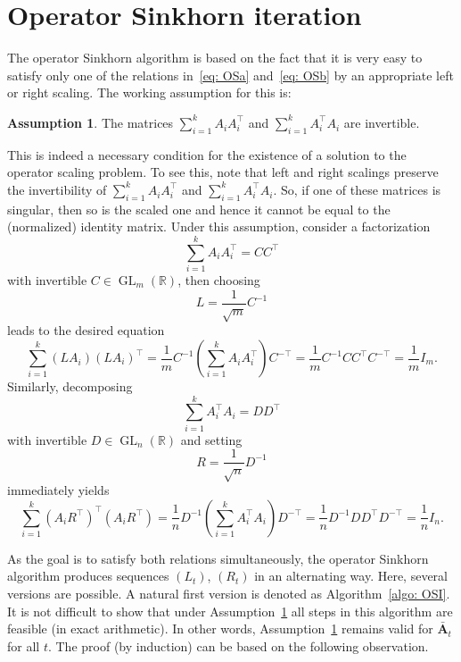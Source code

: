 \documentclass[a4paper]{article}
\newcommand{\R}{\mathbb{R}}
\newcommand{\bA}{\mathbf{A}}
\DeclareMathOperator{\GL}{GL}
\theoremstyle{definition}
\newtheorem{assumption}[theorem]{Assumption}
\numberwithin{equation}{section}
\begin{document}
\section{Operator Sinkhorn iteration}\label{sec: operator Sinkhorn}

The operator Sinkhorn algorithm is based on the fact that it is very easy to satisfy only one of the relations in~\eqref{eq: OSa} and~\eqref{eq: OSb} by an appropriate left or right scaling. The working assumption for this is:

\begin{assumption}\label{assumption 1}
The matrices $\sum_{i=1}^k A_i^{} A_i^\top$ and $\sum_{i=1}^k A_i^\top A_i^{}$ are invertible.
\end{assumption}
This is indeed a necessary condition for the existence of a solution to the operator scaling problem.
To see this, note that left and right scalings preserve the invertibility of $\sum_{i=1}^k A_i^{} A_i^\top$ and $\sum_{i=1}^k A_i^\top A_i^{}$.
So, if one of these matrices is singular, then so is the scaled one and hence it cannot be equal to the (normalized) identity matrix. Under this assumption, consider a factorization
\[
 \sum_{i=1}^k A_i^{} A_i^\top = C C^\top
\]
with invertible $C \in \GL_m(\R)$, then choosing
\begin{equation}\label{eq: update rule for L}
 L = \frac{1}{\sqrt{m}} C^{-1}
\end{equation}
leads to the desired equation
\[
 \sum_{i=1}^k (L A_i^{}) (L A_i)^\top = \frac{1}{m} C^{-1} \left( \sum_{i=1}^k A_i^{} A_i^\top \right) C^{-\top} = \frac{1}{m} C^{-1} C C^\top C^{-\top} = \frac{1}{m} I_m.
\]
Similarly, decomposing
\[
 \sum_{i=1}^k A_i^{\top} A_i^{} = D D^\top
\]
with invertible $D \in \GL_n(\R)$ and setting
\begin{equation}\label{eq: update rule for R}
 R = \frac{1}{\sqrt{n}} D^{-1}
\end{equation}
immediately yields
\[
 \sum_{i=1}^k (A_i R^\top)^{\top} (A_i^{} R^\top) = \frac{1}{n} D^{-1} \left( \sum_{i=1}^k A_i^{\top} A_i^{} \right) D^{-\top} = \frac{1}{n} D^{-1} D D^\top D^{-\top} = \frac{1}{n} I_n.
\]

As the goal is to satisfy both relations simultaneously, the operator Sinkhorn algorithm produces sequences $(L_t)$, $(R_t)$ in an alternating way. Here, several versions are possible. A natural first version is denoted as Algorithm~\ref{algo: OSI}. It is not difficult to show that under Assumption~\ref{assumption 1} all steps in this algorithm are feasible (in exact arithmetic). In other words, Assumption~\ref{assumption 1} remains valid for $\bar{\bA}_t$ for all $t$. The proof (by induction) can be based on the following observation.
\end{document}
